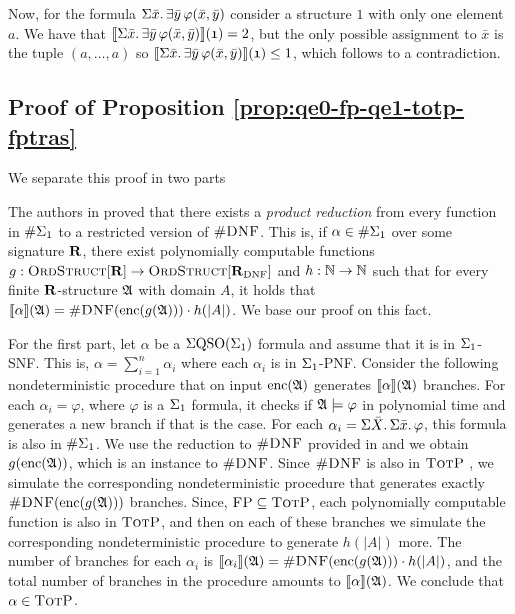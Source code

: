 Now, for the formula $\Sigma{\bar{x}}.\,\exists\bar{y}\,\varphi(\bar{x},\bar{y})$ consider a structure $\mathfrak{1}$ with only one element $a$. We have that ${\llbracket{}{\Sigma{\bar{x}}.\,\exists\bar{y}\,\varphi(\bar{x},\bar{y})}\rrbracket}(\mathfrak{1}) = 2$, but the only possible assignment to $\bar{x}$ is the tuple $(a,\ldots,a)$ so ${\llbracket{}{\Sigma{\bar{x}}.\,\exists\bar{y}\,\varphi(\bar{x},\bar{y})}\rrbracket}(\mathfrak{1}) \leq 1$, which follows to a contradiction.










\subsection*{Proof of Proposition \ref{prop:qe0-fp-qe1-totp-fptras}}

We separate this proof in two parts

\vspace{1em}
The authors in \cite{SalujaST95} proved that there exists a {\em product reduction} from every function in $\#\Sigma_{1}$ to a restricted version of $\textsc{\#DNF}$. This is, if $\alpha\in\#\Sigma_{1}$ over some signature $\mathbf{R}$, there exist polynomially computable functions $g:\text{\sc OrdStruct}[\mathbf{R}]\to\text{\sc OrdStruct}[\mathbf{R}_{\text{DNF}}]$ and $h:\mathbb{N}\to\mathbb{N}$ such that for every finite $\mathbf{R}$-structure $\mathfrak{A}$ with domain $A$, it holds that ${\llbracket{}{\alpha}\rrbracket}(\mathfrak{A}) = \textsc{\#DNF}({\rm enc}(g(\mathfrak{A})))\cdot h(\vert A \vert)$. We base our proof on this fact.

For the first part, let $\alpha$ be a $\Sigma{\rm QSO}(\Sigma_{1})$ formula and assume that it is in $\Sigma_{1}$-SNF. This is, $\alpha = \sum_{i = 1}^n\alpha_i$ where each $\alpha_i$ is in $\Sigma_{1}$-PNF. Consider the following nondeterministic procedure that on input ${\rm enc}(\mathfrak{A})$ generates ${\llbracket{}{\alpha}\rrbracket}(\mathfrak{A})$ branches. For each $\alpha_i = \varphi$, where $\varphi$ is a $\Sigma_{1}$ formula, it checks if $\mathfrak{A}\models\varphi$ in polynomial time and generates a new branch if that is the case. For each $\alpha_i = \Sigma{\bar{X}}.\,\Sigma{\bar{x}}.\,\varphi$, this formula is also in $\#\Sigma_{1}$. We use the reduction to $\textsc{\#DNF}$ provided in \cite{SalujaST95} and we obtain $g({\rm enc}(\mathfrak{A}))$, which is an instance to $\textsc{\#DNF}$. Since $\textsc{\#DNF}$ is also in $\text{\sc TotP}$ \cite{PagourtzisZ06}, we simulate the corresponding nondeterministic procedure that generates exactly $\textsc{\#DNF}({\rm enc}(g(\mathfrak{A})))$ branches. Since, $\text{\sc FP}\subseteq\text{\sc TotP}$\cite{PagourtzisZ06}, each polynomially computable function is also in $\text{\sc TotP}$, and then on each of these branches we simulate the corresponding nondeterministic procedure to generate $h(\vert A \vert)$ more. The number of branches for each $\alpha_i$ is ${\llbracket{}{\alpha_i}\rrbracket}(\mathfrak{A}) = \textsc{\#DNF}({\rm enc}(g(\mathfrak{A})))\cdot h(\vert A \vert)$, and the total number of branches in the procedure amounts to ${\llbracket{}{\alpha}\rrbracket}(\mathfrak{A})$. We conclude that $\alpha\in\text{\sc TotP}$.

